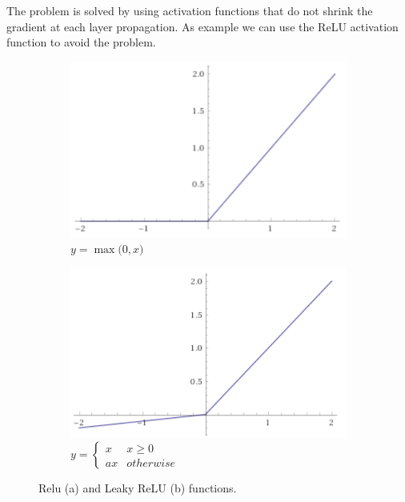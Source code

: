\documentclass[../main.tex]{subfiles}
\begin{document}
The problem is solved by using activation functions that do not shrink the gradient at each layer propagation.
As example we can use the ReLU activation function to avoid the problem.

\begin{figure}[h!]
    \centering
    \begin{subfigure}[c]{0.4\textwidth}
        \includegraphics[width=\linewidth]{images/ReLU.png}
        \caption{$ {y = \max{(0,}{ x)}} $}
        \label{fig:ReLy}
    \end{subfigure}
    \hspace{1cm}
    \begin{subfigure}[c]{0.4\textwidth}
        \includegraphics[width=\linewidth]{images/LeakyReLU.png}
        \caption{$ {y = } \left\{
            \begin{array}{ll}
                x & x\geq 0 \\
                ax & otherwise 
            \end{array} \right. $}
        \label{fig:LeakyReLU}
    \end{subfigure}
    \caption{Relu (a) and Leaky ReLU (b) functions.  }
    \label{fig:ReLUs}
\end{figure}
\end{document}
